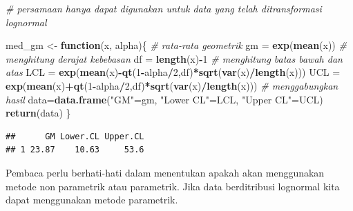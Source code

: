 \documentclass[]{book}
\newenvironment{Shaded}{\begin{snugshade}}{\end{snugshade}}
\newcommand{\KeywordTok}[1]{\textcolor[rgb]{0.13,0.29,0.53}{\textbf{#1}}}
\newcommand{\DataTypeTok}[1]{\textcolor[rgb]{0.13,0.29,0.53}{#1}}
\newcommand{\DecValTok}[1]{\textcolor[rgb]{0.00,0.00,0.81}{#1}}
\newcommand{\FloatTok}[1]{\textcolor[rgb]{0.00,0.00,0.81}{#1}}
\newcommand{\StringTok}[1]{\textcolor[rgb]{0.31,0.60,0.02}{#1}}
\newcommand{\CommentTok}[1]{\textcolor[rgb]{0.56,0.35,0.01}{\textit{#1}}}
\newcommand{\ControlFlowTok}[1]{\textcolor[rgb]{0.13,0.29,0.53}{\textbf{#1}}}
\newcommand{\OperatorTok}[1]{\textcolor[rgb]{0.81,0.36,0.00}{\textbf{#1}}}
\newcommand{\NormalTok}[1]{#1}
\begin{document}
\begin{Shaded}
\begin{Highlighting}[]
\CommentTok{# persamaan hanya dapat digunakan untuk data yang telah ditransformasi lognormal}

\NormalTok{med_gm <-}\StringTok{ }\ControlFlowTok{function}\NormalTok{(x, alpha)\{}
  \CommentTok{# rata-rata geometrik}
\NormalTok{  gm =}\StringTok{ }\KeywordTok{exp}\NormalTok{(}\KeywordTok{mean}\NormalTok{(x))}
  \CommentTok{# menghitung derajat kebebasan}
\NormalTok{  df =}\StringTok{ }\KeywordTok{length}\NormalTok{(x)}\OperatorTok{-}\DecValTok{1}
  \CommentTok{# menghitung batas bawah dan atas}
\NormalTok{  LCL =}\StringTok{ }\KeywordTok{exp}\NormalTok{(}\KeywordTok{mean}\NormalTok{(x)}\OperatorTok{-}\KeywordTok{qt}\NormalTok{(}\DecValTok{1}\OperatorTok{-}\NormalTok{alpha}\OperatorTok{/}\DecValTok{2}\NormalTok{,df)}\OperatorTok{*}\KeywordTok{sqrt}\NormalTok{(}\KeywordTok{var}\NormalTok{(x)}\OperatorTok{/}\KeywordTok{length}\NormalTok{(x)))}
\NormalTok{  UCL =}\StringTok{ }\KeywordTok{exp}\NormalTok{(}\KeywordTok{mean}\NormalTok{(x)}\OperatorTok{+}\KeywordTok{qt}\NormalTok{(}\DecValTok{1}\OperatorTok{-}\NormalTok{alpha}\OperatorTok{/}\DecValTok{2}\NormalTok{,df)}\OperatorTok{*}\KeywordTok{sqrt}\NormalTok{(}\KeywordTok{var}\NormalTok{(x)}\OperatorTok{/}\KeywordTok{length}\NormalTok{(x)))}
  \CommentTok{# menggabungkan hasil}
\NormalTok{  data=}\KeywordTok{data.frame}\NormalTok{(}\StringTok{"GM"}\NormalTok{=gm,}
                  \StringTok{"Lower CL"}\NormalTok{=LCL,}
                  \StringTok{"Upper CL"}\NormalTok{=UCL)}
  \KeywordTok{return}\NormalTok{(data)}
\NormalTok{\}}
\end{Highlighting}
\end{Shaded}

\begin{Shaded}
\end{Shaded}

\begin{verbatim}
##      GM Lower.CL Upper.CL
## 1 23.87    10.63     53.6
\end{verbatim}

Pembaca perlu berhati-hati dalam menentukan apakah akan menggunakan
metode non parametrik atau parametrik. Jika data berditribusi lognormal
kita dapat menggunakan metode parametrik.


\end{document}

